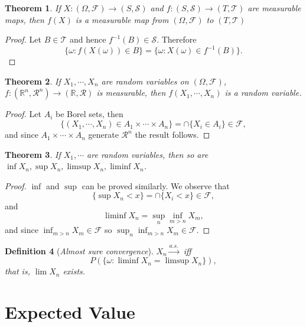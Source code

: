 \documentclass[10pt,a4paper]{article}
\newtheorem{theorem}{Theorem}[section]
\newtheorem{definition}[theorem]{Definition}
\numberwithin{equation}{subsection}
\begin{document}
\begin{theorem}
	If $X: (\Omega, \mathcal{F}) \rightarrow (S, \mathcal{S})$ and
	$f:(S, \mathcal{S}) \rightarrow (T, \mathcal{T})$ are measurable maps, 
	then $f(X)$ is a measurable map from $(\Omega, \mathcal{F})$ to 
	$(T, \mathcal{T})$
\end{theorem}

\begin{proof}
	Let $B \in \mathcal{T}$ and hence $f^{-1}(B) \in \mathcal{S}$. Therefore
	\[
		\{\omega:f(X(\omega)) \in B\} = \{\omega: X(\omega) \in f^{-1}(B)\}. 
	\]
\end{proof}

\begin{theorem}
	If $X_1, \cdots, X_n$ are random variables on $(\Omega, \mathcal{F})$, $f:(\mathbb{R}^n, \mathcal{R}^n) \rightarrow (\mathbb{R}, \mathcal{R})$ is measurable, then $f(X_1, \cdots, X_n)$ is a random variable. 
\end{theorem}

\begin{proof}
	Let $A_i$ be Borel sets, then 
	\[
		\{(X_1, \cdots, X_n) \in A_1 \times \cdots \times A_n\} = \cap \{X_i \in A_i\} \in \mathcal{F},
	\]
	and since $A_1 \times \cdots \times A_n$ generate $\mathcal{R}^n$ the result follows.
\end{proof}


\begin{theorem}
	If $X_1, \cdots $ are random variables, then so are $\inf X_n, \sup X_n, \limsup X_n, \liminf X_n$. 
\end{theorem}

\begin{proof}
	$\inf$ and $\sup$ can be proved similarly. We observe that
	\[
		\{ \sup X_n < x\} = \cap \{X_i < x\}\in \mathcal{F},
	\]
	and 
	\[
		\liminf X_n = \sup_n \inf_{m>n} X_m,
	\]
	and since $\inf_{m>n} X_m \in \mathcal{F}$ so $\sup_n \inf_{m>n} X_m \in \mathcal{F}$.
	
\end{proof}


\begin{definition}[\emph{Almost sure convergence}]
	$X_n \stackrel{a.s.}{\rightarrow}$ iff 
	\[
		P\left(\{\omega: \liminf X_n = \limsup X_n\} \right),
	\]
	that is, $\lim X_n$ exists. 
\end{definition}


\section{Expected Value}
\end{document}
